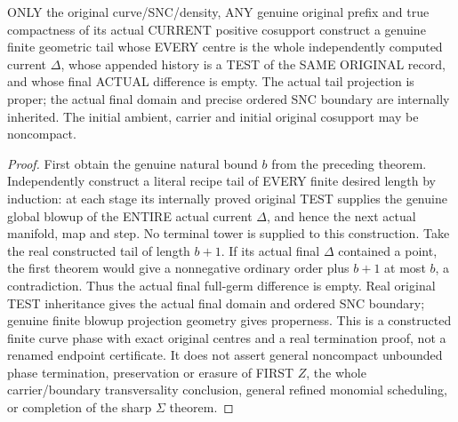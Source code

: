 \begin{theorem}
\label{hir:sharp-original-curve-finite-whole-ambient-difference-phase}
\leanok
ONLY the original curve/SNC/density, ANY genuine original prefix and true
compactness of its actual CURRENT positive cosupport construct a genuine
finite geometric tail whose EVERY centre is the whole independently
computed current $\Delta$, whose appended history is a TEST of the SAME
ORIGINAL record, and whose final ACTUAL difference is empty. The actual
tail projection is proper; the actual final domain and precise ordered
SNC boundary are internally inherited. The initial ambient, carrier and
initial original cosupport may be noncompact.
\end{theorem}
\begin{proof}
First obtain the genuine natural bound $b$ from the preceding theorem.
Independently construct a literal recipe tail of EVERY finite desired
length by induction: at each stage its internally proved original TEST
supplies the genuine global blowup of the ENTIRE actual current
$\Delta$, and hence the next actual manifold, map and step. No terminal
tower is supplied to this construction.
Take the real constructed tail of length $b+1$. If its actual final
$\Delta$ contained a point, the first theorem would give a nonnegative
ordinary order plus $b+1$ at most $b$, a contradiction. Thus the actual
final full-germ difference is empty. Real original TEST inheritance gives
the actual final domain and ordered SNC boundary; genuine finite blowup
projection geometry gives properness. This is a constructed finite curve
phase with exact original centres and a real termination proof, not a
renamed endpoint certificate. It does not assert general noncompact
unbounded phase termination, preservation or erasure of FIRST $Z$, the
whole carrier/boundary transversality conclusion, general refined
monomial scheduling, or completion of the sharp $\Sigma$ theorem.
\end{proof}
